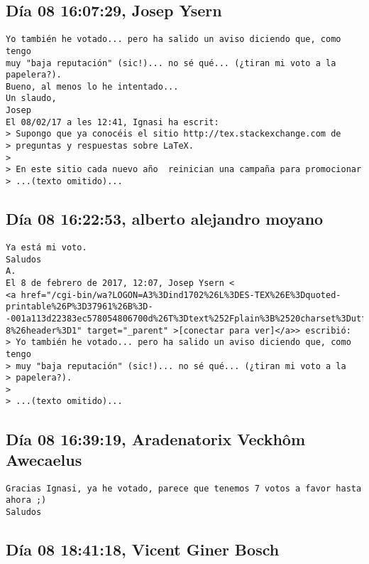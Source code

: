 \documentclass[a4paper,10pt]{article}
\begin{document}
\subsection{Día 08 16:07:29, Josep Ysern}

\begin{lstlisting}
Yo también he votado... pero ha salido un aviso diciendo que, como tengo 
muy "baja reputación" (sic!)... no sé qué... (¿tiran mi voto a la 
papelera?).
Bueno, al menos lo he intentado...
Un slaudo,
Josep
El 08/02/17 a les 12:41, Ignasi ha escrit:
> Supongo que ya conocéis el sitio http://tex.stackexchange.com de 
> preguntas y respuestas sobre LaTeX.
>
> En este sitio cada nuevo año  reinician una campaña para promocionar 
> ...(texto omitido)...

\end{lstlisting}

\subsection{Día 08 16:22:53, alberto alejandro moyano}

\begin{lstlisting}
Ya está mi voto.
Saludos
A.
El 8 de febrero de 2017, 12:07, Josep Ysern <
<a href="/cgi-bin/wa?LOGON=A3%3Dind1702%26L%3DES-TEX%26E%3Dquoted-printable%26P%3D37961%26B%3D--001a113d22383ec578054806700d%26T%3Dtext%252Fplain%3B%2520charset%3Dutf-8%26header%3D1" target="_parent" >[conectar para ver]</a>> escribió:
> Yo también he votado... pero ha salido un aviso diciendo que, como tengo
> muy "baja reputación" (sic!)... no sé qué... (¿tiran mi voto a la
> papelera?).
>
> ...(texto omitido)...

\end{lstlisting}

\subsection{Día 08 16:39:19, Aradenatorix Veckhôm Awecaelus}

\begin{lstlisting}
Gracias Ignasi, ya he votado, parece que tenemos 7 votos a favor hasta ahora ;)
Saludos

\end{lstlisting}

\subsection{Día 08 18:41:18, Vicent Giner Bosch}
\end{document}
